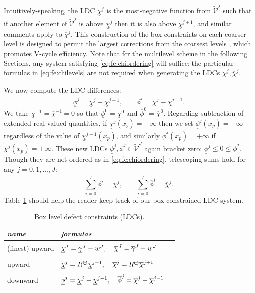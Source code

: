\documentclass[letterpaper,final,12pt,reqno]{amsart}
\theoremstyle{cstyle}
\theoremstyle{cstyle*}
\theoremstyle{dstyle}
\numberwithin{equation}{section}
\numberwithin{figure}{section}
\numberwithin{table}{section}
\numberwithin{theorem}{section}
\newcommand{\maxR}{R^{\bm{\oplus}}}
\newcommand{\minR}{R^{\bm{\ominus}}}
\begin{document}
Intuitively-speaking, the LDC $\underline{\chi}^j$ is the most-negative function from $\tilde{\mathcal{V}}^j$ such that if another element of $\tilde{\mathcal{V}}^j$ is above $\underline{\chi}^j$ then it is also above $\underline{\chi}^{j+1}$, and similar comments apply to $\overline{\chi}^{j}$.  This construction of the box constraints on each coarser level is designed to permit the largest corrections from the coarsest levels \cite{GraeserKornhuber2009}, which promotes V-cycle efficiency.  Note that for the multilevel scheme in the following Sections, any system satisfying \eqref{eq:fe:chiordering} will suffice; the particular formulas in \eqref{eq:fe:chilevels} are not required when generating the LDCs $\underline{\chi}^{j},\overline{\chi}^{j}$.

We now compute the LDC differences:
\begin{equation}
\underline{\phi}^j = \underline{\chi}^j - \underline{\chi}^{j-1}, \qquad \overline{\phi}^j = \overline{\chi}^j - \overline{\chi}^{j-1}.  \label{eq:fe:philevels}
\end{equation}
We take $\underline{\chi}^{-1}=\overline{\chi}^{-1}=0$ so that $\underline{\phi}^0=\underline{\chi}^0$ and $\overline{\phi}^0=\overline{\chi}^0$.  Regarding subtraction of extended real-valued quantities, if $\underline{\chi}^j(x_p)=-\infty$ then we set $\underline{\phi}^j(x_p)=-\infty$ regardless of the value of $\underline{\chi}^{j-1}(x_p)$, and similarly $\overline{\phi}^j(x_p)=+\infty$ if $\overline{\chi}^j(x_p)=+\infty$.  These new LDCs $\underline{\phi}^{j},\overline{\phi}^{j} \in \tilde{\mathcal{V}}^J$ again bracket zero: $\underline{\phi}^j \le 0 \le \overline{\phi}^j$.  Though  they are not ordered as in \eqref{eq:fe:chiordering}, telescoping sums hold for any $j=0,1,\dots,J$:
\begin{equation}
\sum_{i=0}^j \underline{\phi}^i = \underline{\chi}^j, \qquad \sum_{i=0}^j \overline{\phi}^i = \overline{\chi}^j.  \label{eq:fe:telescoping}
\end{equation}
Table \ref{tab:ldcs} should help the reader keep track of our box-constrained LDC system.

\begin{table}[H]
\begin{tabular}{llc}
\emph{name}        & \emph{formulas} \\ \hline
(finest) upward & ${\Large \strut} \underline{\chi}^J = \underline{\gamma}^J - w^J,\quad \overline{\chi}^J = \overline{\gamma}^J - w^J$ \\
upward          & ${\Large \strut} \underline{\chi}^{j} = \maxR \underline{\chi}^{j+1}, \quad \overline{\chi}^{j} = \minR \overline{\chi}^{j+1}$ \\
downward        & ${\Large \strut} \underline{\phi}^j = \underline{\chi}^j - \underline{\chi}^{j-1}, \quad \overline{\phi}^j = \overline{\chi}^j - \overline{\chi}^{j-1}$
\end{tabular}

\medskip
\caption{Box level defect constraints (LDCs).}
\label{tab:ldcs}
\end{table}
\end{document}
